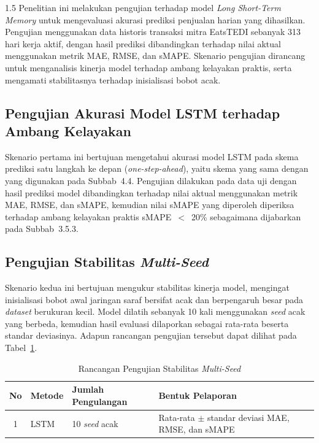 \documentclass[12pt, a4paper, onecolumn, oneside]{report}
\begin{document}
\begin{spacing}{1.5}
Penelitian ini melakukan pengujian terhadap model \textit{Long Short-Term Memory} untuk mengevaluasi akurasi prediksi penjualan harian yang dihasilkan. Pengujian menggunakan data historis transaksi mitra EatsTEDI sebanyak 313 hari kerja aktif, dengan hasil prediksi dibandingkan terhadap nilai aktual menggunakan metrik MAE, RMSE, dan sMAPE. Skenario pengujian dirancang untuk menganalisis kinerja model terhadap ambang kelayakan praktis, serta mengamati stabilitasnya terhadap inisialisasi bobot acak.

\subsection{Pengujian Akurasi Model LSTM terhadap Ambang Kelayakan}

Skenario pertama ini bertujuan mengetahui akurasi model LSTM pada skema prediksi satu langkah ke depan (\textit{one-step-ahead}), yaitu skema yang sama dengan yang digunakan pada Subbab~4.4. Pengujian dilakukan pada data uji dengan hasil prediksi model dibandingkan terhadap nilai aktual menggunakan metrik MAE, RMSE, dan sMAPE, kemudian nilai sMAPE yang diperoleh diperiksa terhadap ambang kelayakan praktis sMAPE~$<$~20\% sebagaimana dijabarkan pada Subbab~3.5.3.

\subsection{Pengujian Stabilitas \textit{Multi-Seed}}

Skenario kedua ini bertujuan mengukur stabilitas kinerja model, mengingat inisialisasi bobot awal jaringan saraf bersifat acak dan berpengaruh besar pada \textit{dataset} berukuran kecil. Model dilatih sebanyak 10 kali menggunakan \textit{seed} acak yang berbeda, kemudian hasil evaluasi dilaporkan sebagai rata-rata beserta standar deviasinya. Adapun rancangan pengujian tersebut dapat dilihat pada Tabel~\ref{tab:skenario2}.

\begin{table}[H]
\centering
\caption{Rancangan Pengujian Stabilitas \textit{Multi-Seed}}
\label{tab:skenario2}
\begin{tabularx}{\textwidth}{|c|l|l|X|}
\hline
\textbf{No} & \textbf{Metode} & \textbf{Jumlah Pengulangan} & \textbf{Bentuk Pelaporan} \\ \hline
1 & LSTM & 10 \textit{seed} acak & Rata-rata $\pm$ standar deviasi MAE, RMSE, dan sMAPE \\ \hline
\end{tabularx}
\end{table}


\end{spacing}
\end{document}
